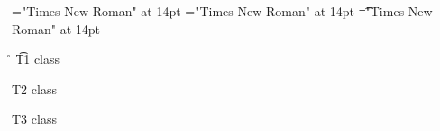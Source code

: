 \font\vxt="Times New Roman" at 14pt
\font\xt="Times New Roman" at 14pt
\font\t="Times New Roman" at 14pt
 \r\n
\t T1 class 

\xt T2 class 

\vxt T3 class 


\bye
